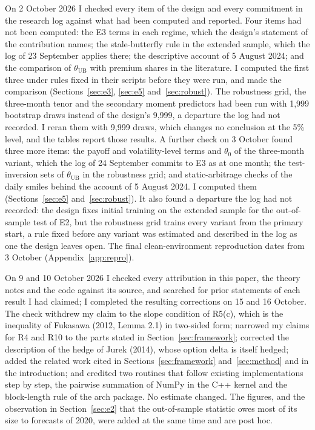\documentclass[11pt]{article}
\theoremstyle{result}
\newcommand{\thUB}{\theta_{\mathrm{UB}}}
\begin{document}
On 2 October 2026 I checked every item of the design and every commitment in the research log against what had been computed and reported. Four items had not been computed: the E3 terms in each regime, which the design's statement of the contribution names; the stale-butterfly rule in the extended sample, which the log of 23 September applies there; the descriptive account of 5 August 2024; and the comparison of $\thUB$ with premium shares in the literature. I computed the first three under rules fixed in their scripts before they were run, and made the comparison (Sections~\ref{sec:e3}, \ref{sec:e5} and~\ref{sec:robust}). The robustness grid, the three-month tenor and the secondary moment predictors had been run with 1,999 bootstrap draws instead of the design's 9,999, a departure the log had not recorded. I reran them with 9,999 draws, which changes no conclusion at the 5\% level, and the tables report those results. A further check on 3 October found three more items: the payoff and volatility-level terms and $\theta_0$ of the three-month variant, which the log of 24 September commits to E3 as at one month; the test-inversion sets of $\thUB$ in the robustness grid; and static-arbitrage checks of the daily smiles behind the account of 5 August 2024. I computed them (Sections~\ref{sec:e5} and~\ref{sec:robust}). It also found a departure the log had not recorded: the design fixes initial training on the extended sample for the out-of-sample test of E2, but the robustness grid trains every variant from the primary start, a rule fixed before any variant was estimated and described in the log as one the design leaves open. The final clean-environment reproduction dates from 3 October (Appendix~\ref{app:repro}).

On 9 and 10 October 2026 I checked every attribution in this paper, the theory notes and the code against its source, and searched for prior statements of each result I had claimed; I completed the resulting corrections on 15 and 16 October. The check withdrew my claim to the slope condition of R5(c), which is the inequality of Fukasawa (2012, Lemma 2.1) in two-sided form; narrowed my claims for R4 and R10 to the parts stated in Section~\ref{sec:framework}; corrected the description of the hedge of Jurek (2014), whose option delta is itself hedged; added the related work cited in Sections~\ref{sec:framework} and~\ref{sec:method} and in the introduction; and credited two routines that follow existing implementations step by step, the pairwise summation of NumPy in the C++ kernel and the block-length rule of the arch package. No estimate changed. The figures, and the observation in Section~\ref{sec:e2} that the out-of-sample statistic owes most of its size to forecasts of 2020, were added at the same time and are post hoc.
\end{document}
